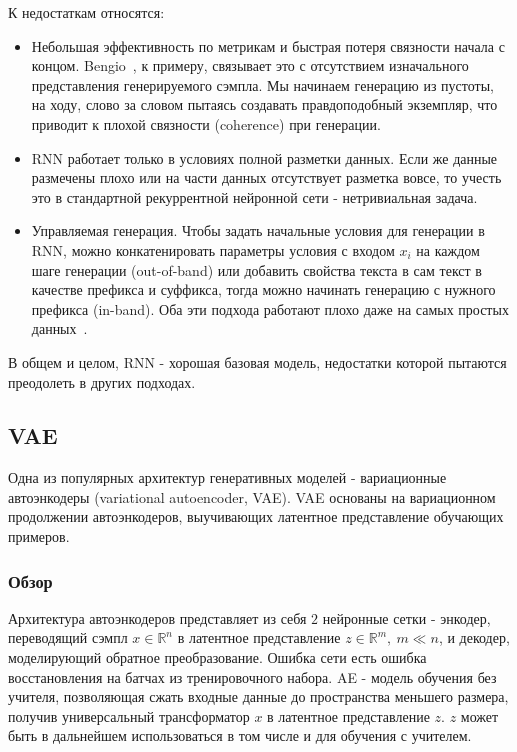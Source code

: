 \documentclass{spbau-diploma}
\begin{document}
К недостаткам относятся:
\begin{itemize}
    \item Небольшая эффективность по метрикам и быстрая потеря связности 
    начала с концом. Bengio~\cite{bengio_rnn}, к примеру, связывает это с 
    отсутствием изначального представления генерируемого сэмпла. Мы 
    начинаем генерацию из пустоты, на ходу, слово за словом пытаясь создавать
    правдоподобный экземпляр, что приводит к плохой связности (coherence) при
    генерации.
    \item RNN работает только в условиях полной разметки данных. Если же данные
    размечены плохо или на части данных отсутствует разметка вовсе, то учесть
    это в стандартной рекуррентной нейронной сети - нетривиальная задача.
    \item Управляемая генерация. Чтобы задать начальные условия для генерации в 
    RNN, можно конкатенировать параметры условия с входом 
    $x_i$ на каждом шаге генерации (out-of-band) или добавить свойства текста
    в сам текст в качестве префикса и суффикса, тогда можно начинать генерацию
    с нужного префикса (in-band). Оба эти подхода работают плохо даже на самых
    простых данных~\cite{rnn_meta}.
\end{itemize}

В общем и целом, RNN - хорошая базовая модель, недостатки которой пытаются 
преодолеть в других подходах.

\subsection{VAE}
Одна из популярных архитектур генеративных моделей - вариационные автоэнкодеры
(variational autoencoder, VAE). VAE основаны на вариационном продолжении 
автоэнкодеров, выучивающих латентное представление обучающих примеров.

\subsubsection{Обзор}
Архитектура автоэнкодеров представляет из себя $2$ нейронные сетки - энкодер, 
переводящий сэмпл $x \in \mathbb{R}^n$ в латентное представление 
$z \in \mathbb{R}^m,~m \ll n$, и декодер, моделирующий обратное преобразование. 
Ошибка сети есть ошибка восстановления на батчах из тренировочного набора. AE -
модель обучения без учителя, позволяющая сжать входные данные до пространства
меньшего размера, получив универсальный трансформатор $x$ в латентное 
представление $z$. $z$ может быть в дальнейшем использоваться в том числе и для
обучения с учителем.
\end{document}
